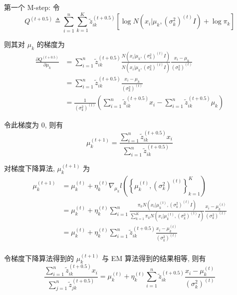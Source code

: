 \documentclass{article}
\begin{document}
第一个 M-step: 令
\begin{equation}
    Q^{(t+0.5)}\triangleq\sum_{i=1}^n\sum_{k=1}^K \tilde{z}_{ik}^{(t+0.5)} \left[\log N\left(x_i\Big|\mu_k,(\sigma_k^2)^{(t)}I\right)+\log\pi_k\right]
\end{equation}

则其对 $\mu_k$ 的梯度为
\begin{equation}
  \begin{aligned}
    \frac{\partial Q^{(t+0.5)}}{\partial \mu_k}
    &=\sum_{i=1}^n\tilde{z}_{ik}^{(t+0.5)}\frac{N\left(x_i\Big|\mu_k,(\sigma_k^2)^{(t)}I\right)}{N\left(x_i\Big|\mu_k,(\sigma_k^2)^{(t)}I\right)}\frac{x_i-\mu_k}{(\sigma_k^2)^{(t)}}\\
    &=\sum_{i=1}^n\tilde{z}_{ik}^{(t+0.5)}\frac{x_i-\mu_k}{(\sigma_k^2)^{(t)}}\\
    &=\frac{1}{(\sigma_k^2)^{(t)}}\left(\sum_{i=1}^n\tilde{z}_{ik}^{(t+0.5)}x_i-\sum_{i=1}^n\tilde{z}_{ik}^{(t+0.5)}\mu_k\right)
  \end{aligned}
\end{equation}

令此梯度为 0, 则有
\begin{equation}
  \mu_k^{(t+1)}=\frac{\displaystyle\sum_{i=1}^n\tilde{z}_{ik}^{(t+0.5)}x_i}{\displaystyle\sum_{i=1}^n\tilde{z}_{ik}^{(t+0.5)}}
\end{equation}

对梯度下降算法, $\mu_k^{(t+1)}$ 为
\begin{equation}
  \begin{aligned}
    \mu_k^{(t+1)}
    &=\mu_k^{(t)}+\eta_k^{(t)}\nabla_{\mu_k}l\left(\left\{\mu_k^{(t)},(\sigma_k ^2)^{(t)}\right\}_{k=1}^K\right)\\
    &=\mu_k^{(t)}+\eta_k^{(t)}\sum_{i=1}^n\frac{\pi_k N\left(x_i\Big|\mu_k^{(t)},(\sigma_k^2)^{(t)}I\right)}{\displaystyle\sum_{k=1}^K\pi_k N\left(x_i\Big|\mu_k^{(t)},(\sigma_k^2)^{(t)}I\right)}\frac{x_i-\mu_k^{(t)}}{(\sigma_k ^2)^{(t)}}\\
    &=\mu_k^{(t)}+\eta_k^{(t)}\sum_{i=1}^n\tilde{z}_{ik}^{(t+0.5)}\frac{x_i-\mu_k^{(t)}}{(\sigma_k ^2)^{(t)}}\\
  \end{aligned}
\end{equation}

令梯度下降算法得到的 $\mu_k^{(t+1)}$ 与 EM 算法得到的结果相等, 则有
\begin{equation}
  \frac{\displaystyle\sum_{i=1}^n\tilde{z}_{ik}^{(t+0.5)}x_i}{\displaystyle\sum_{j=1}^n\tilde{z}_{jk}^{(t+0.5)}}
  =\mu_k^{(t)}+\eta_k^{(t)}\sum_{i=1}^n\tilde{z}_{ik}^{(t+0.5)}\frac{x_i-\mu_k^{(t)}}{(\sigma_k ^2)^{(t)}}
\end{equation}
\end{document}
